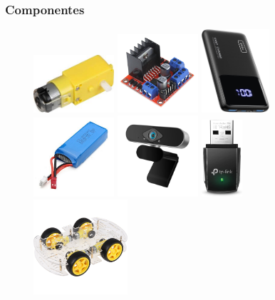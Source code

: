 \documentclass{beamer}
\begin{document}
\begin{frame}
	\frametitle{Componentes}
	\begin{figure}
		\centering
		\includegraphics[width=3cm]{figs/motorTT}
		\includegraphics[width=3cm]{figs/l298n}
		\includegraphics[width=2.5cm]{figs/battery2}
		\includegraphics[width=3cm]{figs/tarantula}
		\includegraphics[width=3cm]{figs/camera}
		\includegraphics[width=1.5cm]{figs/tplink}
		\includegraphics[width=3.5cm]{figs/chasis}

\end{figure}
\end{frame}
\end{document}
